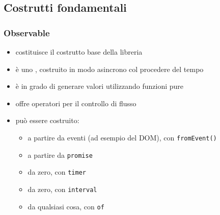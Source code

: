         \subsection{Costrutti fondamentali}\label{subsec:costrutti}

            \subsubsection{Observable}\label{subsub:observable}

            \begin{frame}{\insertsubsectionhead}
                \begin{block}{\texttt{\insertsubsubsectionhead}}
                    \begin{itemize}
                        \item
                            costituisce il costrutto base della libreria
                        \item
                            è uno , costruito in modo asincrono col procedere del tempo
                        \item
                            è in grado di generare valori utilizzando funzioni pure
                        \item
                            offre operatori per il controllo di flusso
                        \item
                            può essere costruito:
                            \begin{itemize}
                                \item a partire da eventi (ad esempio del DOM), con \texttt{fromEvent()}
                                \item a partire da \texttt{promise}
                                \item da zero, con \texttt{timer}
                                \item da zero, con \texttt{interval}
                                \item da qualsiasi cosa, con \texttt{of}
                            \end{itemize}
                    \end{itemize}
                \end{block}
            \end{frame}

